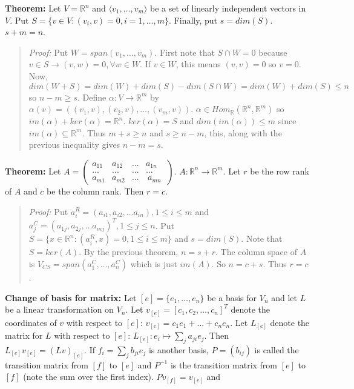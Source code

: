 {\bf Theorem:} Let $V= {\mathbb R}^n$ and $\langle v_1, \ldots, v_m \rangle$ be a set of linearly independent vectors in $V$.
Put $S= \{v \in V: (v_i, v)= 0, i = 1, \ldots, m\}$.  Finally, put $s= dim(S)$.  $s+m = n$.
\begin{quote}
\emph{Proof:}  
Put $W= span(v_1, \ldots, v_m)$.
First note that $S \cap W = 0$ because $v \in S \rightarrow (v,w)=0, \forall w \in W$.  If $v \in W$, this means $(v,v)=0$ so
$v=0$.  Now, $dim(W+S) = dim(W) + dim(S) - dim(S \cap W)= dim(W) + dim(S) \leq n$  so $n - m \geq s$.  
Define $\alpha: V \rightarrow {\mathbb R}^m$ by $\alpha(v) = ( (v_1, v), (v_2, v), \ldots, (v_m, v) )$. 
$\alpha \in Hom_{\mathbb R}({\mathbb R}^n, {\mathbb R}^m)$ so $im(\alpha) + ker(\alpha) = {\mathbb R}^n$.
$ker(\alpha) = S$ and $dim(im(\alpha)) \leq m$ since $im(\alpha) \subseteq {\mathbb R}^m$.  Thus
$m + s \geq n$ and $s \geq n-m$, this, along with the previous inequality gives $n-m=s$.
\end{quote}
{\bf Theorem:}  Let $A=
\left(
\begin{array}{cccc}
a_{11} & a_{12} & ... & a_{1n} \\
... & ... & ... & ... \\
a_{m1} &  a_{m2} & ... & \ a_{mn}\
\end{array}
\right)$.  $A: {\mathbb R}^n \rightarrow {\mathbb R}^m$.  Let $r$ be the row rank of $A$ and $c$ be the column rank. Then
$r=c$.
\begin{quote}
\emph{Proof:}  
Put $a_i^{R} = (a_{i1},  a_{i2} ,  \ldots a_{in}), 1 \leq i \leq m$ and 
$a_j^{C} = (a_{1j},  a_{2j} ,  \ldots a_{mj})^T, 1 \leq j \leq n$.
Put $S= \{x \in {\mathbb R}^n: (a_i^{R}, x)=0, 1 \leq i \leq m \}$ and $s= dim(S)$.  Note that $S=ker(A)$.  By the previous theorem,
$n= s + r$. The column space of $A$ is $V_{CS}= span(a_1^{C}, \ldots ,a_n^{C})$ which is just $im(A)$.  So
$n = c +s$.  Thus $r=c$.
\end{quote}
{\bf Change of basis for matrix:}
Let $[e]= \{ e_1 , \ldots , e_n \}$ be a basis for $V_n$ and let $L$ be a
linear transformation on $V_n$.  Let 
$v_{[e]} = [c_1 , c_2 , ... , c_n]^T$ denote the
coordinates of $v$ with respect to $[e]$: $v_{[e]}= c_1 e_1 + ...+ c_n e_n$.
Let $L_{[e]}$ denote the
matrix for $L$ with respect to $[e]$: $L_{[e]}: e_i \mapsto \sum_j a_{ji} e_j$. Then
$L_{[e]} v_{[e]} = (Lv)_{[e]}$.  If $f_i= \sum_j b_{ji} e_j$ is another basis,
$P= (b_{ij})$ is called the transition matrix from $[f]$ to $[e]$ and $P^{-1}$ is
the transition matrix from $[e]$ to $[f]$ (note the sum over the first index).
$Pv_{[f]}= v_{[e]}$ and
